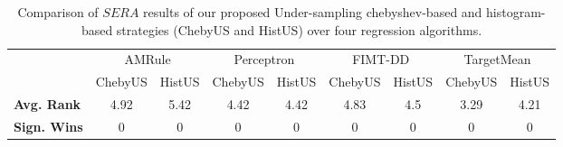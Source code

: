     \begin{table}[!htb]
        \centering
        \caption{Comparison of $SERA$ results of our proposed Under-sampling chebyshev-based and histogram-based strategies (ChebyUS and HistUS) over four regression algorithms.}
        \label{tab:Sum_ChebyUS_HistUS_SERA_Under}
        \begin{tabular}{ |l|c|c|c|c|c|c|c|c|}
        \hline
            \multirow{2}{4em}{ }&
            \multicolumn{2}{|c|}{AMRule} &
            \multicolumn{2}{|c|}{Perceptron} &
            \multicolumn{2}{|c|}{FIMT-DD} &
            \multicolumn{2}{|c|}{TargetMean}
        \\
        \cline{2-9}
        & ChebyUS & HistUS & ChebyUS & HistUS & ChebyUS & HistUS &
        ChebyUS & HistUS \\
        \hline
        {\bf Avg. Rank} & 4.92 & 5.42 & 4.42 & 4.42 & 4.83 & 4.5 & 3.29 & 4.21 \\
        \hline
        {\bf Sign. Wins} & 0 & 0 & 0 & 0 & 0 & 0 & 0 & 0 \\
        \hline
        \end{tabular}
    \end{table}